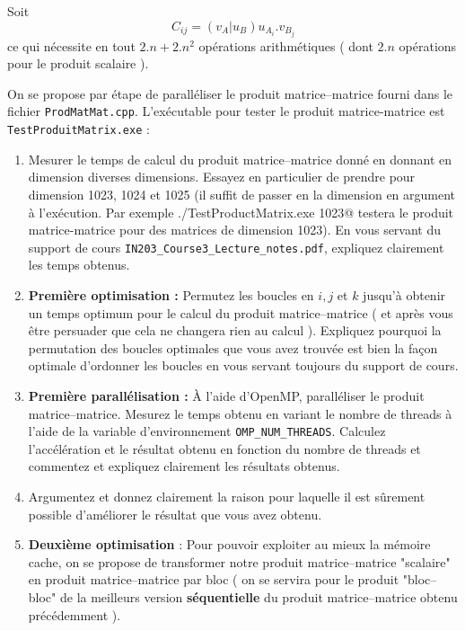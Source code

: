 \documentclass[11pt,a4paper]{article}
\begin{document}
Soit
\[
C_{ij} = \left(v_{A}|u_{B}\right)u_{A_{i}}.v_{B_{j}}
\]
ce qui nécessite en tout $2.n+2.n^{2}$ opérations arithmétiques ( dont $2.n$ opérations pour le produit scalaire ).

On se propose par étape de paralléliser le produit matrice--matrice fourni dans le fichier \texttt{ProdMatMat.cpp}. L'exécutable pour tester le produit matrice-matrice est \texttt{TestProduitMatrix.exe} :

\begin{enumerate}
	\item Mesurer le temps de calcul du produit matrice--matrice donné en donnant en dimension diverses dimensions. Essayez en particulier de prendre pour dimension 1023, 1024 et 1025 (il suffit de passer en la dimension en argument à l'exécution. Par exemple \verb@./TestProductMatrix.exe 1023@ testera le produit matrice-matrice pour des matrices de dimension 1023). En vous servant du support
	de cours \texttt{IN203\_Course3\_Lecture\_notes.pdf}, expliquez clairement les temps obtenus.
	\item \textbf{\color{blue}Première optimisation :} Permutez les  boucles en $i,j$ et $k$ jusqu'à obtenir un temps optimum pour le calcul du produit matrice--matrice ( et après vous être persuader que cela ne changera rien au calcul ). Expliquez pourquoi la permutation des boucles optimales que vous avez trouvée
	est bien la façon optimale d'ordonner les boucles en vous servant toujours du support de cours.
	\item \textbf{\color{blue}Première parallélisation : } \`A l'aide d'OpenMP, paralléliser le produit matrice--matrice. Mesurez le temps obtenu en variant le nombre de threads à l'aide de la variable d'environnement \texttt{OMP\_NUM\_THREADS}. Calculez l'accélération et le résultat obtenu en fonction du nombre de threads et commentez et expliquez clairement les résultats obtenus. 
	\item Argumentez et donnez clairement la raison pour laquelle il est sûrement possible d'améliorer le
	résultat que vous avez obtenu.
	\item \textbf{\color{blue}Deuxième optimisation }: 
	Pour pouvoir exploiter au mieux la mémoire cache, on se propose de transformer notre produit matrice--matrice "scalaire" en produit matrice--matrice par bloc ( on se servira pour le produit "bloc--bloc" de la meilleurs version \textbf{séquentielle} du produit matrice--matrice obtenu précédemment ).


\end{enumerate}
\end{document}
